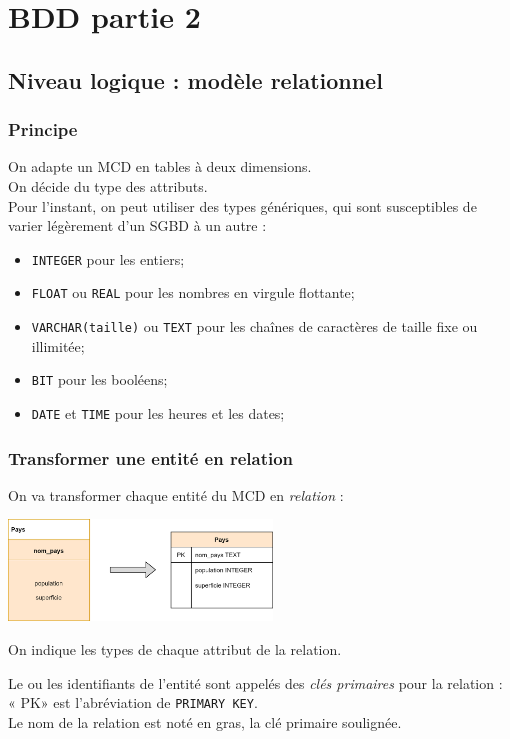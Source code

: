 \documentclass[10pt,cours,a4paper,firamath]{nsi}
\begin{document}
\chapter{BDD partie 2}


\section{Niveau logique : modèle relationnel}
\subsection{Principe}
On adapte un MCD en tables à deux dimensions.\\
On décide du type des attributs.\\
Pour l'instant, on peut utiliser des types génériques, qui sont susceptibles de varier légèrement d'un SGBD à un autre :
\begin{itemize}
	\item	\texttt{INTEGER} pour les entiers;
	\item	\texttt{FLOAT} ou \texttt{REAL} pour les nombres en virgule flottante;
	\item	\texttt{VARCHAR(taille)} ou \texttt{TEXT} pour les chaînes de caractères de taille fixe ou illimitée;
	\item 	\texttt{BIT} pour les booléens;
	\item 	\texttt{DATE} et \texttt{TIME} pour les heures et les dates;
\end{itemize}



\subsection{Transformer une entité en relation}
On va transformer chaque entité du MCD en \textit{relation} :
\begin{center}
	\includegraphics[width=7cm]{img/entite_vers_relation}
\end{center}
On indique les types de chaque attribut de la relation.

Le ou les identifiants de l'entité sont appelés des \textit{clés primaires} pour la relation : « PK» est l'abréviation de \texttt{PRIMARY KEY}.\\
Le nom de la relation est noté en gras, la clé primaire soulignée.\\
\end{document}
